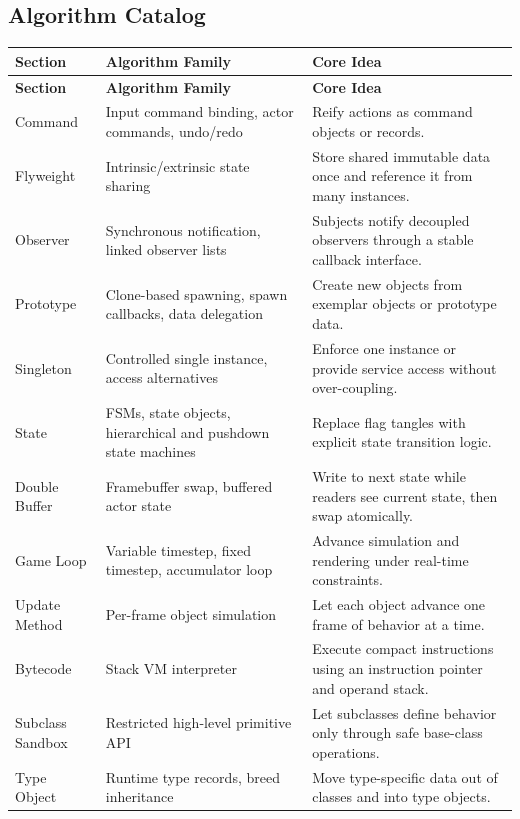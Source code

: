 \documentclass[10pt,letterpaper]{article}
\begin{document}
\subsection{Algorithm Catalog}

\begin{longtable}{L{0.20\textwidth}L{0.34\textwidth}L{0.36\textwidth}}
\toprule
\textbf{Section} & \textbf{Algorithm Family} & \textbf{Core Idea} \\
\midrule\endfirsthead
\toprule
\textbf{Section} & \textbf{Algorithm Family} & \textbf{Core Idea} \\
\midrule\endhead
Command & Input command binding, actor commands, undo/redo & Reify actions as command objects or records. \\
Flyweight & Intrinsic/extrinsic state sharing & Store shared immutable data once and reference it from many instances. \\
Observer & Synchronous notification, linked observer lists & Subjects notify decoupled observers through a stable callback interface. \\
Prototype & Clone-based spawning, spawn callbacks, data delegation & Create new objects from exemplar objects or prototype data. \\
Singleton & Controlled single instance, access alternatives & Enforce one instance or provide service access without over-coupling. \\
State & FSMs, state objects, hierarchical and pushdown state machines & Replace flag tangles with explicit state transition logic. \\
Double Buffer & Framebuffer swap, buffered actor state & Write to next state while readers see current state, then swap atomically. \\
Game Loop & Variable timestep, fixed timestep, accumulator loop & Advance simulation and rendering under real-time constraints. \\
Update Method & Per-frame object simulation & Let each object advance one frame of behavior at a time. \\
Bytecode & Stack VM interpreter & Execute compact instructions using an instruction pointer and operand stack. \\
Subclass Sandbox & Restricted high-level primitive API & Let subclasses define behavior only through safe base-class operations. \\
Type Object & Runtime type records, breed inheritance & Move type-specific data out of classes and into type objects. \\

\end{longtable}
\end{document}
